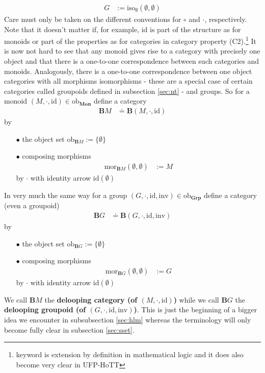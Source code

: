 \begin{exa}
\begin{align*}
  G
  &:=
  \mathrm{iso}_{\pmb{\emptyset}}(\emptyset,\emptyset)
\end{align*}
Care must only be taken on the different conventions for $\circ$ and $\cdot$, respectively. Note that it doesn't matter if, for example, $\mathrm{id}$ is part of the structure as for monoids or part of the properties as for categories in category property (C2).\footnote{keyword is extension by definition in mathematical logic and it does also become very clear in UFP-HoTT} It is now not hard to see that any monoid gives rise to a category with precisely one object and that there is a one-to-one correspondence between such categories and monoids. Analogously, there is a one-to-one correspondence between one object categories with all morphisms isomorphisms - these are a special case of certain categories called groupoids defined in subsection \ref{sec:nt} - and groups. So for a monoid $(M,\cdot,\mathrm{id}) \in \mathrm{ob}_{\mathbf{Mon}}$ define a category
\begin{align*}
  \mathbf{B}M
  &\doteq
  \mathbf{B}(M,\cdot,\mathrm{id})
\end{align*}
by
\begin{enumerate}
\item[$\bullet$]
the object set $\mathrm{ob}_{\mathbf{B}M} := \lbrace \emptyset \rbrace$
\item[$\bullet$]
composing morphisms
\begin{align*}
  \mathrm{mor}_{\mathbf{B}M}(\emptyset,\emptyset)
  &:=
  M
\end{align*}
by $\cdot$ with identity arrow $\mathrm{id}(\emptyset)$
\end{enumerate}
In very much the same way for a group $(G,\cdot,\mathrm{id},\mathrm{inv}) \in \mathrm{ob}_{\mathbf{Grp}}$ define a category (even a groupoid)
\begin{align*}
  \mathbf{B}G
  &\doteq
  \mathbf{B}(G,\cdot,\mathrm{id},\mathrm{inv})
\end{align*}
by
\begin{enumerate}
\item[$\bullet$]
the object set $\mathrm{ob}_{\mathbf{B}G} := \lbrace \emptyset \rbrace$
\item[$\bullet$]
composing morphisms
\begin{align*}
  \mathrm{mor}_{\mathbf{B}G}(\emptyset,\emptyset)
  &:=
  G
\end{align*}
by $\cdot$ with identity arrow $\mathrm{id}(\emptyset)$
\end{enumerate}
We call $\mathbf{B}M$ the \textbf{delooping category (of $(M,\cdot,\mathrm{id})$)} while we call $\mathbf{B}G$ the \textbf{delooping groupoid (of $(G,\cdot,\mathrm{id},\mathrm{inv})$)}. This is just the beginning of a bigger idea we encounter in subsubsection \ref{sec:hlm} whereas the terminology will only become fully clear in subsection \ref{sec:sset}.
\end{exa}
